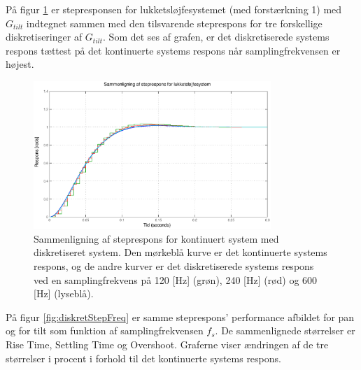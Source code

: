 På figur \ref{fig:diskretTiltStep} er stepresponsen for lukketsløjfesystemet (med forstærkning 1)
med \(G_{tilt}\) indtegnet sammen med den tilsvarende steprespons for tre forskellige diskretiseringer
af \(G_{tilt}\). Som det ses af grafen, er det diskretiserede systems respons tættest
på det kontinuerte systems respons når samplingfrekvensen er højest.
\begin{figure}[!th]
\centering
	\includegraphics[width=0.8\textwidth]{./graphics/diskretTiltStep.eps}
	\captionsetup{width=0.7\textwidth}
\caption[Sammenligning af steprespons performance]
{Sammenligning af steprespons for kontinuert system med diskretiseret system.
Den mørkeblå kurve er det kontinuerte systems respons,
og de andre kurver er det diskretiserede systems respons ved en samplingfrekvens på
120 [Hz] (grøn), 240 [Hz] (rød) og 600 [Hz] (lyseblå).}
\label{fig:diskretTiltStep}
\end{figure}
På figur \ref{fig:diskretStepFreq} er samme steprespons' performance afbildet
for pan og for tilt som funktion af samplingfrekvensen \(f_s\).
De sammenlignede størrelser er Rise Time, Settling Time og Overshoot.
Graferne viser ændringen af de tre størrelser i procent i forhold til det kontinuerte systems respons.
